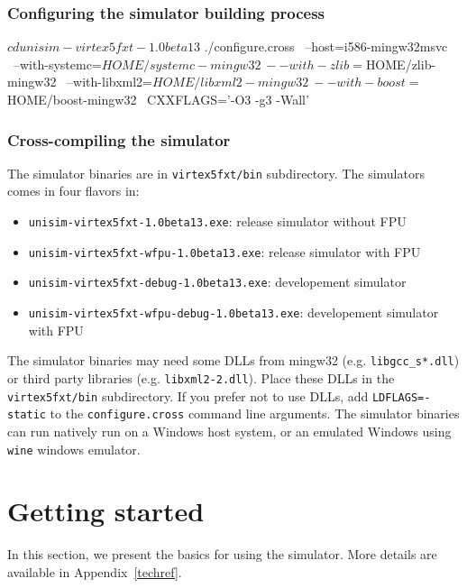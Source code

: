 \subsubsection{Configuring the simulator building process}
\begin{script}
  $ cd unisim-virtex5fxt-1.0beta13
  $ ./configure.cross \
          --host=i586-mingw32msvc \
          --with-systemc=${HOME}/systemc-mingw32 \
          --with-zlib=${HOME}/zlib-mingw32 \
          --with-libxml2=${HOME}/libxml2-mingw32 \
          --with-boost=${HOME}/boost-mingw32 \
          CXXFLAGS='-O3 -g3 -Wall'
\end{script}

\subsubsection{Cross-compiling the simulator}
\begin{script}
   $ make -f Makefile.cross
\end{script}

\noindent The simulator binaries are in \texttt{virtex5fxt/bin} subdirectory.
The simulators comes in four flavors in:
\begin{itemize}
\item \texttt{unisim-virtex5fxt-1.0beta13.exe}: release simulator without FPU
\item \texttt{unisim-virtex5fxt-wfpu-1.0beta13.exe}: release simulator with FPU
\item \texttt{unisim-virtex5fxt-debug-1.0beta13.exe}: developement simulator
\item \texttt{unisim-virtex5fxt-wfpu-debug-1.0beta13.exe}: developement simulator with FPU
\end{itemize}

The simulator binaries may need some DLLs from mingw32 (e.g. \texttt{libgcc\_s*.dll}) or third party libraries (e.g. \texttt{libxml2-2.dll}).
Place these DLLs in the \texttt{virtex5fxt/bin} subdirectory.
If you prefer not to use DLLs, add \texttt{LDFLAGS=-static} to the \texttt{configure.cross} command line arguments.
The simulator binaries can run natively run on a Windows host system, or an emulated Windows using \texttt{wine} windows emulator.

\section{Getting started}
\label{getting_started}

In this section, we present the basics for using the simulator.
More details are available in Appendix~\ref{techref}.

